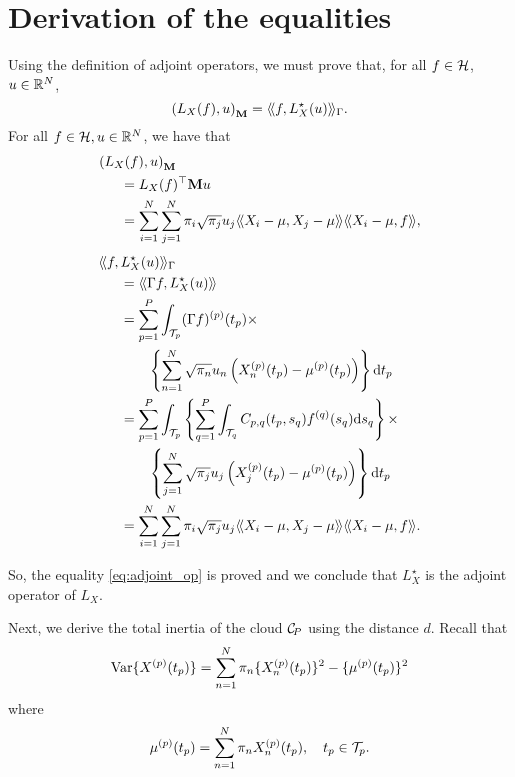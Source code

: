 \section{Derivation of the equalities} %
\label{sec:derivation_of_the_inertia_of_the_clouds}

Using the definition of adjoint operators, we must prove that, for all $f \in \mathcal{H}$, $u \in \mathbb{R}^N$,
\begin{equation}\label{eq:adjoint_op}
    \inRM{L_X(f)}{u} = \inHG{f}{L^\star_X(u)}.
\end{equation}
For all $f \in \mathcal{H}, u \in \mathbb{R}^N$, we have that
\begin{align*}
    \inRM{L_X(f)}{u} & \\
    &\mkern-72mu = L_X(f)^\top \mathbf{M} u \\
    &\mkern-72mu = \sum_{i = 1}^N\sum_{j = 1}^N \pi_i \sqrt{\pi_j} u_j \inH{X_i - \mu}{X_j - \mu} \inH{X_i - \mu}{f},
\end{align*}
\begin{align*}
    \inHG{f}{L^\star_X(u)} & \\
    &\mkern-72mu = \inH{\Gamma f}{L^\star_X(u)} \\
    &\mkern-72mu = \sum_{p = 1}^P \int_{\TT{p}} (\Gamma f)^{(p)}(t_p) \times \\
    &\mkern-36mu \left\{ \sum_{n = 1}^N \sqrt{\pi_n} u_n \left(\Xnp(t_p) - \mup{p}(t_p)\right) \right\} \dd t_p \\
    &\mkern-72mu = \sum_{p = 1}^P \int_{\TT{p}} \left\{\sum_{q = 1}^P \int_{\TT{q}} C_{p,q}(t_p, s_q)f^{(q)}(s_q) \dd s_q\right\} \times \\
    &\mkern-36mu \left\{ \sum_{j = 1}^N \sqrt{\pi_j} u_j \left(X_j^{(p)}(t_p) - \mup{p}(t_p)\right) \right\} \dd t_p \\
    &\mkern-72mu = \sum_{i = 1}^N\sum_{j = 1}^N \pi_i \sqrt{\pi_j} u_j \inH{X_i - \mu}{X_j - \mu}\inH{X_i - \mu}{f}.
\end{align*}

So, the equality \eqref{eq:adjoint_op} is proved and we conclude that $L^\star_X$ is the adjoint operator of $L_X$.

Next, we derive the total inertia of the cloud $\mathcal{C}_{\!P}$ using the distance $d$. Recall that 
\begin{equation}\label{eq:var_appendix}
    \Var\{\Xp{p}(t_p)\} = \sum_{n = 1}^N \pi_n \{\Xnp(t_p)\}^2 - \{\mup{p}(t_p)\}^2
\end{equation}
where
\begin{equation}
     \mup{p}(t_p) = \sum_{n = 1}^N \pi_n\Xnp(t_p), \quad t_p \in \TT{p}.
\end{equation}


